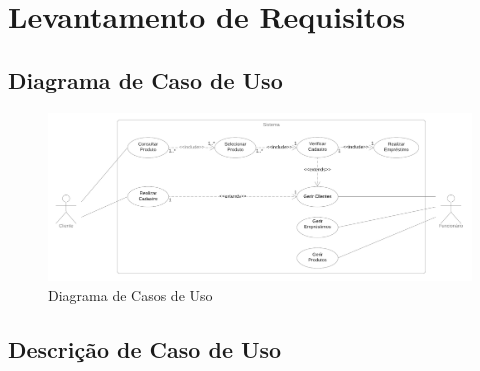 \documentclass[a4paper, 12pt]{article}
\begin{document}
\section{Levantamento de Requisitos}

\subsection{Diagrama de Caso de Uso}

\begin{figure}[H]
\includegraphics[width=\textwidth]{./img/casos-de-uso.png}
\centering
\caption{Diagrama de Casos de Uso}\label{img:casos-de-uso}
\end{figure}

\subsection{Descrição de Caso de Uso}
\end{document}
